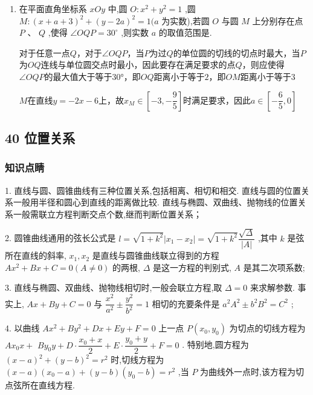 \begin{enumerate}
\begin{jieda}
        故$|PO| = 4$，因此$l$到原点的距离小于等于4，即$\dfrac{6}{\sqrt{1+k^2}} \leq 4$，解得$k \in \left(-\infty, -\dfrac{\sqrt{5}}{2}\right] \cup \left[\dfrac{\sqrt{5}}{2}, +\infty\right)$
    \end{jieda}
    \item 在平面直角坐标系 ${xOy}$ 中,圆 $O : {x}^{2} + {y}^{2} = 1$ ,圆 $M : {\left( x + a + 3\right) }^{2} + {\left( y - 2a\right) }^{2} = 1(a$ 为实数),若圆 $O$ 与圆 $M$ 上分别存在点 $P\text{ 、 }Q$ ,使得 $\angle {OQP} = {30}^{ \circ  }$ ,则实数 $a$ 的取值范围是.
    \begin{jieda}
        对于任意一点$Q$，对于$\angle{OQP}$，当$P$为过$Q$的单位圆的切线的切点时最大，当$P$为$OQ$连线与单位圆交点时最小，因此要存在满足要求的点$Q$，则应使得$\angle{OQP}$的最大值大于等于$\ang{30}$，即$OQ$距离小于等于$2$，即$OM$距离小于等于$3$

        $M$在直线$y = -2x-6$上，故$x_M \in \left[-3, -\dfrac{9}{5}\right]$时满足要求，因此$a \in \left[-\dfrac{6}{5}, 0\right]$
    \end{jieda}
\end{enumerate}

\subsection*{40 位置关系}

\subsubsection*{知识点睛}

1. 直线与圆、圆锥曲线有三种位置关系,包括相离、相切和相交. 直线与圆的位置关系一般用半径和圆心到直线的距离做比较. 直线与椭圆、双曲线、抛物线的位置关系一般需联立方程判断交点个数,继而判断位置关系；

2. 圆锥曲线通用的弦长公式是 $l = \sqrt{1 + {k}^{2}}\left| {{x}_{1} - {x}_{2}}\right|  = \sqrt{1 + {k}^{2}}\dfrac{\sqrt{\Delta }}{\left| A\right| }$ ,其中 $k$ 是弦所在直线的斜率, ${x}_{1},{x}_{2}$ 是直线与圆锥曲线联立得到的方程 $A{x}^{2} + {Bx} + C = 0\left( {A \neq  0}\right)$ 的两根, $\Delta$ 是这一方程的判别式, $A$ 是其二次项系数;

3. 直线与椭圆、双曲线、抛物线相切时,一般会联立方程,取 $\Delta  = 0$ 来求解参数. 事实上, ${Ax} + {By} + C = 0$ 与 $\dfrac{{x}^{2}}{{a}^{2}} \pm  \dfrac{{y}^{2}}{{b}^{2}} = 1$ 相切的充要条件是 ${a}^{2}{A}^{2} \pm  {b}^{2}{B}^{2} = {C}^{2}$ ;

4. 以曲线 $A{x}^{2} + B{y}^{2} + {Dx} + {Ey} + F = 0$ 上一点 $P\left( {{x}_{0},{y}_{0}}\right)$ 为切点的切线方程为 $A{x}_{0}x +$  $B{y}_{0}y + D \cdot  \dfrac{{x}_{0} + x}{2} + E \cdot  \dfrac{{y}_{0} + y}{2} + F = 0$ . 特别地,圆方程为 ${\left( x - a\right) }^{2} + {\left( y - b\right) }^{2} = {r}^{2}$ 时,切线方程为 $\left( {x - a}\right) \left( {{x}_{0} - a}\right)  + \left( {y - b}\right) \left( {{y}_{0} - b}\right)  = {r}^{2}$ ,当 $P$ 为曲线外一点时,该方程为切点弦所在直线方程.

